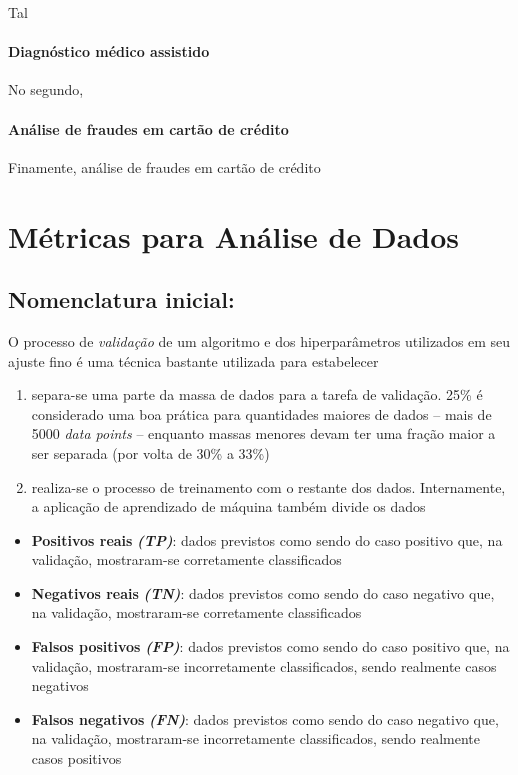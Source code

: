 \documentclass[]{article}
\let\oldparagraph\paragraph
\renewcommand{\paragraph}[1]{\oldparagraph{#1}\mbox{}}
\begin{document}
Tal

\hypertarget{header-n1095}{%
\paragraph{Diagnóstico médico assistido}\label{header-n1095}}

No segundo,

\hypertarget{header-n1098}{%
\paragraph{Análise de fraudes em cartão de crédito}\label{header-n1098}}

Finamente, análise de fraudes em cartão de crédito

\hypertarget{header-n1101}{%
\section{Métricas para Análise de Dados}\label{header-n1101}}

\hypertarget{header-n1102}{%
\subsection{Nomenclatura inicial:}\label{header-n1102}}

O processo de \emph{validação} de um algoritmo e dos hiperparâmetros
utilizados em seu ajuste fino é uma técnica bastante utilizada para
estabelecer

\begin{enumerate}
\def\labelenumi{\arabic{enumi}.}
\item
  separa-se uma parte da massa de dados para a tarefa de validação. 25\%
  é considerado uma boa prática para quantidades maiores de dados --
  mais de 5000 \emph{data points} -- enquanto massas menores devam ter
  uma fração maior a ser separada (por volta de 30\% a 33\%)
\item
  realiza-se o processo de treinamento com o restante dos dados.
  Internamente, a aplicação de aprendizado de máquina também divide os
  dados 
\end{enumerate}

\begin{itemize}
\item
  \textbf{Positivos reais} \textbf{\emph{(TP)}}: dados previstos como
  sendo do caso positivo que, na validação, mostraram-se corretamente
  classificados
\item
  \textbf{Negativos reais} \textbf{\emph{(TN)}}: dados previstos como
  sendo do caso negativo que, na validação, mostraram-se corretamente
  classificados
\item
  \textbf{Falsos positivos} \textbf{\emph{(FP)}}: dados previstos como
  sendo do caso positivo que, na validação, mostraram-se incorretamente
  classificados, sendo realmente casos negativos
\item
  \textbf{Falsos negativos} \textbf{\emph{(FN)}}: dados previstos como
  sendo do caso negativo que, na validação, mostraram-se incorretamente
  classificados, sendo realmente casos positivos 
\end{itemize}
\end{document}
